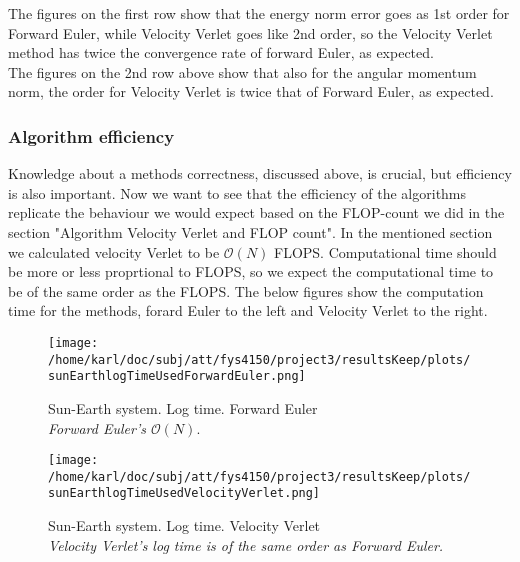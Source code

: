\documentclass{article}
\begin{document}
The figures on the first row show that the energy norm error goes as 1st order for Forward Euler, while Velocity Verlet goes like 2nd order, so the Velocity Verlet method has twice the convergence rate of forward Euler, as expected.\\

The figures on the 2nd row above show that also for the angular momentum norm, the order for Velocity Verlet is twice that of Forward Euler, as expected.

\subsubsection{Algorithm efficiency}
Knowledge about a methods correctness, discussed above, is crucial, but efficiency is also important. Now we want to see that the efficiency of the algorithms replicate the behaviour we would expect based on the FLOP-count we did in the section "Algorithm Velocity Verlet and FLOP count". In the mentioned section we calculated velocity Verlet to be $\mathcal{O}(N)$ FLOPS. Computational time should be more or less proprtional to FLOPS, so we expect the computational time to be of the same order as the FLOPS. The below figures show the computation time for the methods, forard Euler to the left and Velocity Verlet to the right.

\begin{minipage}{.49\textwidth} 
	\begin{figure}[H]
		\centering
		\texttt{[image: /home/karl/doc/subj/att/fys4150/project3/resultsKeep/plots/sunEarthlogTimeUsedForwardEuler.png]}
		\caption{Sun-Earth system. Log time. Forward Euler \\ \textit{Forward Euler's $\mathcal{O}(N)$}.}
		\label{1}
	\end{figure}
\end{minipage}\hfill
\begin{minipage}{.49\textwidth} 
	\begin{figure}[H]
		\centering
		\texttt{[image: /home/karl/doc/subj/att/fys4150/project3/resultsKeep/plots/sunEarthlogTimeUsedVelocityVerlet.png]}
		\caption{Sun-Earth system. Log time. Velocity Verlet \\ \textit{Velocity Verlet's log time is of the same order as Forward Euler.}}
		\label{1}
	\end{figure}
\end{minipage}\hfill
\vspace{2ex}
\end{document}
